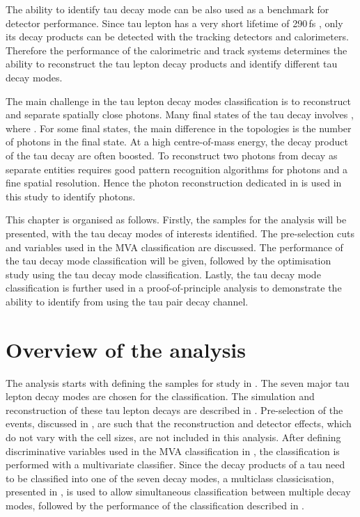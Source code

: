 The ability to identify tau decay mode can be also used as a benchmark for detector performance. Since tau lepton has a very short lifetime of 290\,fs \cite{Abreu:1991jn,Agashe:2014kda}, only its decay products can be detected with the tracking detectors and calorimeters. Therefore the performance of the calorimetric and track systems determines the ability to reconstruct the tau lepton decay products and identify different tau decay modes.

The main challenge in the tau lepton decay modes  classification is to reconstruct and separate spatially close photons. Many final states of the tau decay involves \Ppizero, where \HepProcess{\Ppizero \to \Pphoton \Pphoton}. For some final states, the main difference in the topologies is the number of photons in the final state. At a high centre-of-mass energy, the decay product of the tau decay are often boosted.  To reconstruct two photons from \Ppizero decay as separate entities requires good pattern recognition algorithms for photons and a fine \ECAL spatial resolution. Hence the photon reconstruction dedicated in  is used in this study to identify photons.

This chapter is organised as follows. Firstly, the samples for the analysis will be presented, with the tau decay modes of interests identified. The pre-selection cuts and variables used in the MVA classification are discussed. The performance of the tau decay mode classification will be given, followed by the \ECAL optimisation study using the tau decay mode classification. Lastly, the  tau decay mode classification is further used in a proof-of-principle analysis to demonstrate the ability to identify \PHiggs from \PZ using the tau pair decay channel.

%



\section{Overview of the analysis}

The analysis starts with defining the samples for study in . The seven major tau lepton decay modes are chosen for the classification. The simulation and reconstruction of these tau lepton decays are described in .  Pre-selection of the events, discussed in , are such that the reconstruction and detector effects, which do not vary with the \ECAL cell sizes, are not included in this analysis. After defining discriminative variables used in the MVA classification in , the classification is performed with a multivariate classifier. Since the decay products of a tau need to be classified into one of the seven decay modes, a multiclass classicisation, presented in , is used to allow simultaneous classification between  multiple decay modes, followed by the performance of the classification described in .

